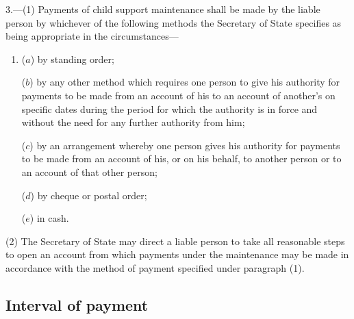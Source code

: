 \documentclass[12pt,a4paper]{article}
\begin{document}
3.—(1) Payments of child support maintenance%
shall be made by the liable person by whichever of the following methods the Secretary of State specifies as being appropriate in the circumstances—
\begin{enumerate}\item[]
($a$) by standing order;

($b$) by any other method which requires one person to give his authority for payments to be made from an account of his to an account of another’s on specific dates during the period for which the authority is in force and without the need for any further authority from him;

($c$) by an arrangement whereby one person gives his authority for payments to be made from an account of his, or on his behalf, to another person or to an account of that other person;

($d$) by cheque or postal order;

($e$) in cash.
\end{enumerate}


(2) The Secretary of State may direct a liable person to take all reasonable steps to open an account from which payments under the maintenance 
may be made in accordance with the method of payment specified under paragraph (1).


\subsection[4. Interval of payment]{Interval of payment}
\end{document}
